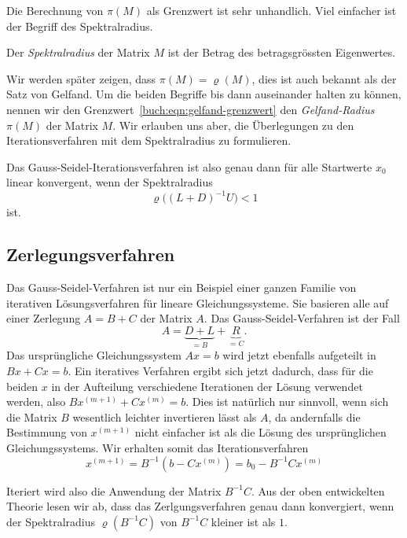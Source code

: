 Die Berechnung von $\pi(M)$ als Grenzwert ist sehr unhandlich.
Viel einfacher ist der Begriff des Spektralradius.

\begin{definition}
\label{buch:definition:spektralradius}
Der {\em Spektralradius} der Matrix $M$ ist der Betrag des betragsgrössten
Eigenwertes.
\end{definition}

Wir werden später zeigen, dass $\pi(M) = \varrho(M)$, dies ist auch
bekannt als der Satz von Gelfand.
Um die beiden Begriffe bis dann auseinander halten zu können,
nennen wir den Grenzwert~\ref{buch:eqn:gelfand-grenzwert}
den {\em Gelfand-Radius} $\pi(M)$ der Matrix $M$.
Wir erlauben uns aber, die Überlegungen zu den Iterationsverfahren
mit dem Spektralradius zu formulieren.

Das Gauss-Seidel-Iterationsverfahren ist also genau dann für alle
Startwerte $x_0$ linear konvergent, wenn der Spektralradius
\[
\varrho\bigl( (L+D)^{-1}U \bigr) < 1
\]
ist.

\subsection{Zerlegungsverfahren
\label{buch:subsection:zerlegung}}
Das Gauss-Seidel-Verfahren ist nur ein Beispiel einer ganzen Familie
von iterativen Lösungsverfahren für lineare Gleichungssysteme.
Sie basieren alle auf einer Zerlegung $A=B+C$ der Matrix $A$.
Das Gauss-Seidel-Verfahren ist der Fall
\[
A = \underbrace{D+L}_{\displaystyle = B} + \underbrace{R}_{\displaystyle = C}.
\]
Das ursprüngliche Gleichungssystem $Ax=b$ wird jetzt ebenfalls
aufgeteilt in $Bx+Cx=b$.
Ein iteratives Verfahren ergibt sich jetzt dadurch, dass für die beiden $x$
in der Aufteilung verschiedene Iterationen der Lösung verwendet werden,
also $Bx^{(m+1)} + Cx^{(m)} = b$.
Dies ist natürlich nur sinnvoll, wenn sich die Matrix $B$ wesentlich
leichter invertieren lässt als $A$, da andernfalls die Bestimmung von
$x^{(m+1)}$ nicht einfacher ist als die Lösung des ursprünglichen
Gleichungssystems.
Wir erhalten somit das Iterationsverfahren
\begin{equation}
x^{(m+1)}
=
B^{-1}(b-Cx^{(m)})
=
b_0 - B^{-1}Cx^{(m)}
\end{equation}

Iteriert wird also die Anwendung der Matrix $B^{-1}C$.
Aus der oben entwickelten Theorie lesen wir ab, dass das Zerlgungsverfahren
genau dann konvergiert, wenn der Spektralradius 
$\varrho(B^{-1}C)$ von $B^{-1}C$ kleiner ist als $1$.

